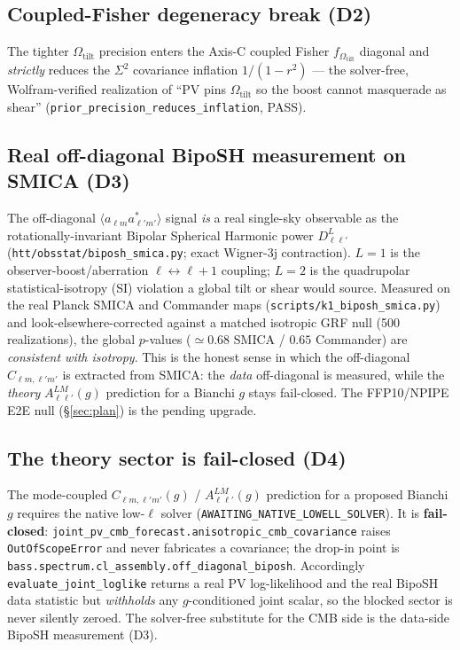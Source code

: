 \documentclass[11pt]{article}
\newcommand{\code}[1]{\texttt{\small #1}}
\newcommand{\Sig}{\Sigma^2}
\newcommand{\Otilt}{\Omega_{\mathrm{tilt}}}
\begin{document}
\subsection{Coupled-Fisher degeneracy break (D2)}
The tighter $\Otilt$ precision enters the Axis-C coupled Fisher $f_{\Otilt}$
diagonal and \emph{strictly} reduces the $\Sig$ covariance inflation
$1/(1-r^2)$ --- the solver-free, Wolfram-verified realization of ``PV pins
$\Otilt$ so the boost cannot masquerade as shear''
(\code{prior\_precision\_reduces\_inflation}, PASS).

\subsection{Real off-diagonal BipoSH measurement on SMICA (D3)}
The off-diagonal $\langle a_{\ell m}a^{*}_{\ell'm'}\rangle$ signal \emph{is} a
real single-sky observable as the rotationally-invariant Bipolar
Spherical Harmonic power $D^L_{\ell\ell'}$
(\code{htt/obsstat/biposh\_smica.py}; exact Wigner-3j contraction). $L{=}1$ is
the observer-boost/aberration $\ell\!\leftrightarrow\!\ell{+}1$ coupling; $L{=}2$
is the quadrupolar statistical-isotropy (SI) violation a global tilt or shear
would source. Measured on the real Planck SMICA and Commander maps
(\code{scripts/k1\_biposh\_smica.py}) and look-elsewhere-corrected against a
matched isotropic GRF null (500 realizations), the global $p$-values
($\simeq0.68$ SMICA / $0.65$ Commander) are \emph{consistent with isotropy}.
This is the honest sense in which the off-diagonal $C_{\ell m,\ell'm'}$ is
extracted from SMICA: the \emph{data} off-diagonal is measured, while the
\emph{theory} $A^{LM}_{\ell\ell'}(g)$ prediction for a Bianchi $g$ stays
fail-closed. The FFP10/NPIPE E2E null (\S\ref{sec:plan}) is the pending upgrade.

\subsection{The theory sector is fail-closed (D4)}
The mode-coupled $C_{\ell m,\ell'm'}(g)$ / $A^{LM}_{\ell\ell'}(g)$ prediction for
a proposed Bianchi $g$ requires the native low-$\ell$ solver
(\code{AWAITING\_NATIVE\_LOWELL\_SOLVER}). It is \textbf{fail-closed}:
\code{joint\_pv\_cmb\_forecast.anisotropic\_cmb\_covariance} raises
\code{OutOfScopeError} and never fabricates a covariance; the drop-in point is
\code{bass.spectrum.cl\_assembly.off\_diagonal\_biposh}. Accordingly
\code{evaluate\_joint\_loglike} returns a real PV log-likelihood and the real
BipoSH data statistic but \emph{withholds} any $g$-conditioned joint scalar, so
the blocked sector is never silently zeroed. The solver-free substitute for the
CMB side is the data-side BipoSH measurement (D3).
\end{document}
